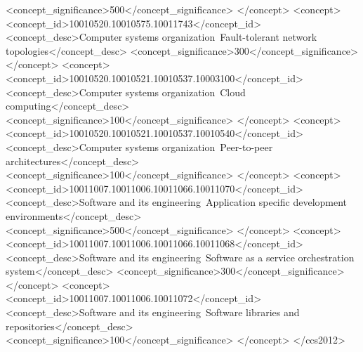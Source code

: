 \begin{CCSXML}
       <concept_significance>500</concept_significance>
       </concept>
   <concept>
       <concept_id>10010520.10010575.10011743</concept_id>
       <concept_desc>Computer systems organization~Fault-tolerant network topologies</concept_desc>
       <concept_significance>300</concept_significance>
       </concept>
   <concept>
       <concept_id>10010520.10010521.10010537.10003100</concept_id>
       <concept_desc>Computer systems organization~Cloud computing</concept_desc>
       <concept_significance>100</concept_significance>
       </concept>
   <concept>
       <concept_id>10010520.10010521.10010537.10010540</concept_id>
       <concept_desc>Computer systems organization~Peer-to-peer architectures</concept_desc>
       <concept_significance>100</concept_significance>
       </concept>
   <concept>
       <concept_id>10011007.10011006.10011066.10011070</concept_id>
       <concept_desc>Software and its engineering~Application specific development environments</concept_desc>
       <concept_significance>500</concept_significance>
       </concept>
   <concept>
       <concept_id>10011007.10011006.10011066.10011068</concept_id>
       <concept_desc>Software and its engineering~Software as a service orchestration system</concept_desc>
       <concept_significance>300</concept_significance>
       </concept>
   <concept>
       <concept_id>10011007.10011006.10011072</concept_id>
       <concept_desc>Software and its engineering~Software libraries and repositories</concept_desc>
       <concept_significance>100</concept_significance>
       </concept>
 </ccs2012>
\end{CCSXML}

